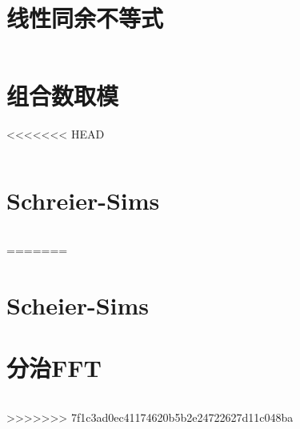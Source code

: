 \section{线性同余不等式}
\inputminted{cpp}{\source/number-theory/linear-inequaltion.cpp}
\section{组合数取模}
<<<<<<< HEAD
\inputminted{cpp}{\source/number-theory/module.cpp}
\section{Schreier-Sims}
\inputminted{cpp}{\source/number-theory/Schreier-Sims.cpp}
=======
\section{Scheier-Sims}
\section{分治FFT}
\inputminted{cpp}{\source/number-theory/cdq-fft.cpp}
>>>>>>> 7f1c3ad0ec41174620b5b2e24722627d11c048ba
